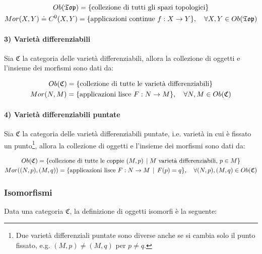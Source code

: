 \begin{gather}
	Ob(\mathfrak{Top}) = \{ \text{collezione di tutti gli spazi topologici} \}\\
	Mor(X,Y) \doteq C^{0}(X,Y) = \{ \text{applicazioni continue } f : X \to Y \} \qcomma \forall X,Y \in Ob(\mathfrak{Top})
\end{gather}

\paragraph{3) Varietà differenziabili}

Sia $ \mathfrak{C} $ la categoria delle varietà differenziabili, allora la collezione di oggetti e l'insieme dei morfismi sono dati da:

\begin{gather}
	Ob(\mathfrak{C}) = \{ \text{collezione di tutte le varietà differenziabili} \}\\
	Mor(N,M) = \{ \text{applicazioni lisce } F : N \to M \} \qcomma \forall N,M \in Ob(\mathfrak{C})
\end{gather}

\paragraph{4) Varietà differenziabili puntate}

Sia $ \mathfrak{C} $ la categoria delle varietà differenziabili puntate, i.e. varietà in cui è fissato un punto\footnote{%
	Due varietà differenziali puntate sono diverse anche se si cambia solo il punto fissato, e.g. $ (M,p) \neq (M,q) $ per $ p \neq q $.%
}, allora la collezione di oggetti e l'insieme dei morfismi sono dati da:

\begin{gather}
	Ob(\mathfrak{C}) = \{ \text{collezione di tutte le coppie } (M,p) \, \mid M \text{ varietà differenziabili}, \, p \in M \}\\
		Mor((N,p),(M,q)) = \{ \text{applicazioni lisce } F : N \to M \, \mid \, F(p)=q \} \qcomma \forall (N,p),(M,q) \in Ob(\mathfrak{C})
\end{gather}

\subsubsection{Isomorfismi}

Data una categoria $ \mathfrak{C} $, la definizione di oggetti isomorfi è la seguente:

